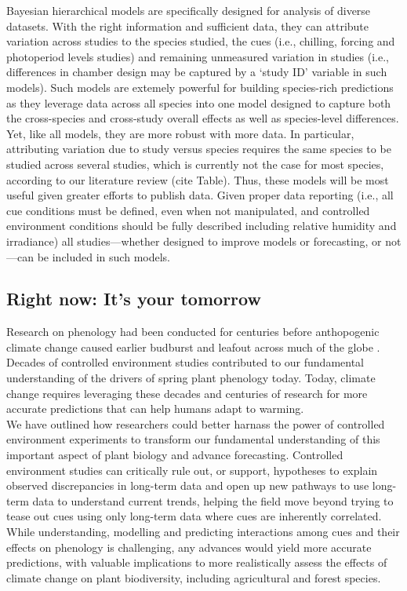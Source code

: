\documentclass[11pt,letter]{article}
\begin{document}
Bayesian hierarchical models are specifically designed for analysis of diverse datasets. With the right information and sufficient data, they can attribute variation across studies to the species studied, the cues (i.e., chilling, forcing and photoperiod levels studies) and remaining unmeasured variation in studies (i.e., differences in chamber design may be captured by a `study ID' variable in such models). Such models are extemely powerful for building species-rich predictions as they leverage data across all species into one model designed to capture both the cross-species and cross-study overall effects as well as species-level differences. Yet, like all models, they are more robust with more data. In particular, attributing variation due to study versus species requires the same species to be studied across several studies, which is currently not the case for most species, according to our literature review (cite Table). Thus, these models will be most useful given greater efforts to publish data. Given proper data reporting (i.e., all cue conditions must be defined, even when not manipulated, and controlled environment conditions should be fully described including relative humidity and irradiance) all studies---whether designed to improve models or forecasting, or not---can be included in such models. 

\subsection{Right now: It's your tomorrow}
Research on phenology had been conducted for centuries before anthopogenic climate change caused earlier budburst and leafout across much of the globe \citep{Sparks:1995mv}. Decades of controlled environment studies contributed to our fundamental understanding of the drivers of spring plant phenology today. Today, climate change requires leveraging these decades and centuries of research for more accurate predictions that can help humans adapt to warming. \\

We have outlined how researchers could better harnass the power of controlled environment experiments to transform our fundamental understanding of this important aspect of plant biology and advance forecasting. Controlled environment studies can critically rule out, or support, hypotheses to explain observed discrepancies in long-term data and open up new pathways to use long-term data to understand current trends, helping the field move beyond trying to tease out cues using only long-term data where cues are inherently correlated. While understanding, modelling and predicting interactions among cues and their effects on phenology is challenging, any advances would yield more accurate predictions, with valuable implications to more realistically assess the effects of climate change on plant biodiversity, including agricultural and forest species. 
\end{document}

